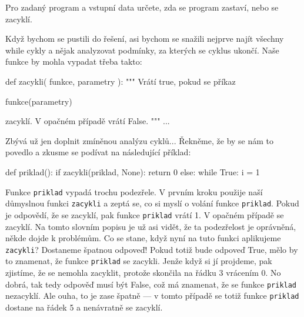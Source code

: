 \begin{uloha}\label{uloha:halting-problem} Pro zadaný program a vstupní data určete, zda se program zastaví, nebo se zacyklí.
\end{uloha}

Když bychom se pustili do řešení, asi bychom se snažili nejprve najít všechny while cykly a nějak analyzovat
podmínky, za kterých se cyklus ukončí. Naše funkce by mohla vypadat třeba takto:

\begin{python}
def zacykli( funkce, parametry ):
    """ Vrátí true, pokud se příkaz 
    
         funkce(parametry)
       
        zacyklí. V opačném případě vrátí False.
    """
    ...
\end{python}

Zbývá už jen doplnit zmíněnou analýzu cyklů... Řekněme, že by se nám to povedlo a zkusme se podívat na následující
příklad:

\begin{python}
def priklad():
    if zacykli(priklad, None):
        return 0
    else:
        while True:
          i = 1
\end{python}

Funkce {\tt priklad} vypadá trochu podezřele. V prvním kroku použije naší důmyslnou funkci {\tt zacykli} a
zeptá se, co si myslí o volání funkce {\tt priklad}. Pokud je odpovědí, že se zacyklí, pak funkce
{\tt priklad} vrátí 1. V opačném případě se zacyklí. Na tomto slovním popisu je už asi vidět, že ta
podezřelost je oprávněná, někde dojde k problémům. Co se stane, když nyní na tuto funkci aplikujeme
{\tt zacykli}? Dostaneme špatnou odpoveď! Pokud totiž bude odpoveď True, mělo by to znamenat, že funkce
{\tt priklad} se zacykli. Jenže když si jí projdeme, pak zjistíme, že se nemohla zacyklit, protože
skončila na řádku 3 vrácením 0. No dobrá, tak tedy odpověď musí být False, což má znamenat, že se
funkce {\tt priklad} nezacyklí. Ale ouha, to je zase špatně --- v tomto případě se totiž funkce {\tt priklad}
dostane na řádek 5 a nenávratně se zacyklí.

\ifx\ucebnice\undefined

\fi
